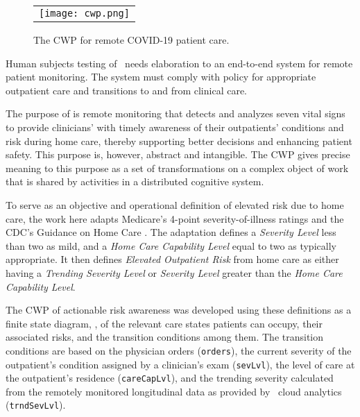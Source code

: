 \begin{figure*}[t]
  \begin{center}
    \begin{tabular}{c}
      \texttt{[image: cwp.png]}
    \end{tabular}
  \end{center}
\caption{The CWP for remote COVID-19 patient care.}
\label{fig:cwp}
\end{figure*}

Human subjects testing of \phware\ needs elaboration to an end-to-end system for remote patient monitoring.
The system must comply with policy for appropriate outpatient care and transitions to and from clinical care.

The purpose of \phware is remote monitoring that detects and analyzes seven vital signs to provide clinicians' with timely awareness of their outpatients' conditions and risk during home care, thereby supporting better decisions and enhancing patient safety.
This purpose is, however, abstract and intangible.
The CWP gives precise meaning to this purpose as a set of transformations on a complex object of work that is shared by activities in a distributed cognitive system.

To serve as an objective and operational definition of elevated risk due to home care, the work here adapts Medicare's 4-point severity-of-illness ratings \cite{Hornbrook2005OverviewOD,severity} and the CDC's Guidance on Home Care \cite{cdc}.
The adaptation defines a \emph{Severity Level} less than two as mild, and a \emph{Home Care Capability Level} equal to two as typically appropriate.
It then defines \emph{Elevated Outpatient Risk} from home care as either having a \emph{Trending Severity Level} or \emph{Severity Level} greater than the \emph{Home Care Capability Level}.

The CWP of actionable risk awareness was developed using these definitions as a finite state diagram, , of the relevant care states patients can occupy, their associated risks, and the transition conditions among them.
The transition conditions are based on the physician orders (\texttt{orders}), the current severity of the outpatient's condition assigned by a clinician's exam (\texttt{sevLvl}), the level of care at the outpatient's residence (\texttt{careCapLvl}), and the trending severity calculated from the remotely monitored longitudinal data as provided by
\phware\ cloud analytics (\texttt{trndSevLvl}). 

